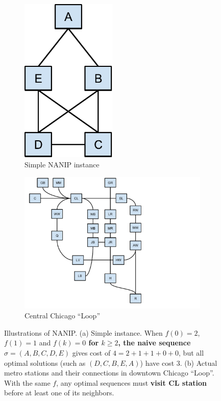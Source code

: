 \documentclass[english]{llncs}
\newcommand{\chg}[1]{\textbf{\color{red} #1}}
\begin{document}
\begin{figure}[th]
\begin{subfigure}[b]{0.4\textwidth}
\centering
\includegraphics[width=0.5\textwidth]{simple}
\caption{Simple NANIP instance}
\end{subfigure}%
\begin{subfigure}[b]{0.6\textwidth}
\centering
\includegraphics[width=1.0\textwidth]{Chicago_Loop_schematic} 
\caption{Central Chicago ``Loop''}
\end{subfigure}
\caption{Illustrations of NANIP.
(a) Simple instance.  
When $f(0)=2$, $f(1)=1$ and \chg{$f(k)=0$ for $k\ge2$, the naive sequence} $\sigma=(A,B,C,D,E)$
gives cost of $4=2+1+1+0+0$, but all optimal solutions (such as $(D,C,B,E,A)$) have cost $3$.\label{fig:illustration}
(b) Actual metro stations and their connections in downtown Chicago ``Loop''.  
With the same $f$, any optimal sequences must \chg{visit CL station} before at least one of its neighbors.}
\end{figure}
\end{document}
